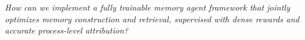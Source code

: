 \documentclass[11pt, a4paper]{lumia}
\begin{document}

\begin{tcolorbox}[
    colback=cream,      %
    colframe=black!80,  %
    boxrule=0.8pt,      %
    arc=4pt,            %
    boxsep=2pt,         %
    left=3pt, right=3pt, top=2pt, bottom=2pt, %
]
    \itshape %
   How can we implement a fully trainable memory agent framework that jointly optimizes memory construction and retrieval, supervised with dense rewards and accurate process-level attribution?
\end{tcolorbox}
\end{document}
